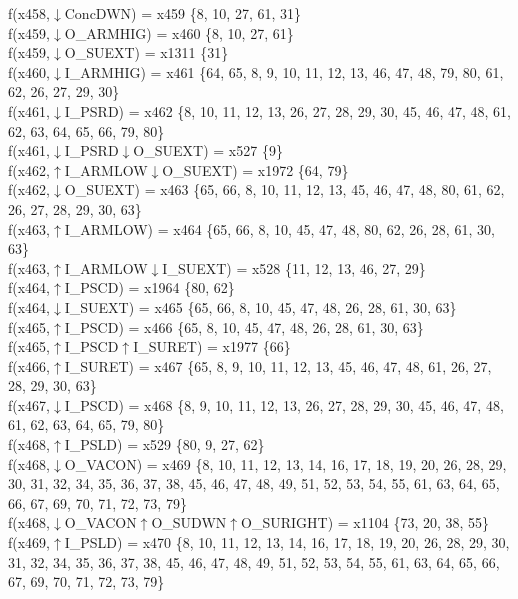 f(x458,$\downarrow$ConcDWN) = x459 \{8, 10, 27, 61, 31\} \\  
f(x459,$\downarrow$O\_ARMHIG) = x460 \{8, 10, 27, 61\} \\  
f(x459,$\downarrow$O\_SUEXT) = x1311 \{31\} \\  
f(x460,$\downarrow$I\_ARMHIG) = x461 \{64, 65, 8, 9, 10, 11, 12, 13, 46, 47, 48, 79, 80, 61, 62, 26, 27, 29, 30\} \\  
f(x461,$\downarrow$I\_PSRD) = x462 \{8, 10, 11, 12, 13, 26, 27, 28, 29, 30, 45, 46, 47, 48, 61, 62, 63, 64, 65, 66, 79, 80\} \\  
f(x461,$\downarrow$I\_PSRD$\downarrow$O\_SUEXT) = x527 \{9\} \\  
f(x462,$\uparrow$I\_ARMLOW$\downarrow$O\_SUEXT) = x1972 \{64, 79\} \\  
f(x462,$\downarrow$O\_SUEXT) = x463 \{65, 66, 8, 10, 11, 12, 13, 45, 46, 47, 48, 80, 61, 62, 26, 27, 28, 29, 30, 63\} \\  
f(x463,$\uparrow$I\_ARMLOW) = x464 \{65, 66, 8, 10, 45, 47, 48, 80, 62, 26, 28, 61, 30, 63\} \\  
f(x463,$\uparrow$I\_ARMLOW$\downarrow$I\_SUEXT) = x528 \{11, 12, 13, 46, 27, 29\} \\  
f(x464,$\uparrow$I\_PSCD) = x1964 \{80, 62\} \\  
f(x464,$\downarrow$I\_SUEXT) = x465 \{65, 66, 8, 10, 45, 47, 48, 26, 28, 61, 30, 63\} \\  
f(x465,$\uparrow$I\_PSCD) = x466 \{65, 8, 10, 45, 47, 48, 26, 28, 61, 30, 63\} \\  
f(x465,$\uparrow$I\_PSCD$\uparrow$I\_SURET) = x1977 \{66\} \\  
f(x466,$\uparrow$I\_SURET) = x467 \{65, 8, 9, 10, 11, 12, 13, 45, 46, 47, 48, 61, 26, 27, 28, 29, 30, 63\} \\  
f(x467,$\downarrow$I\_PSCD) = x468 \{8, 9, 10, 11, 12, 13, 26, 27, 28, 29, 30, 45, 46, 47, 48, 61, 62, 63, 64, 65, 79, 80\} \\  
f(x468,$\uparrow$I\_PSLD) = x529 \{80, 9, 27, 62\} \\  
f(x468,$\downarrow$O\_VACON) = x469 \{8, 10, 11, 12, 13, 14, 16, 17, 18, 19, 20, 26, 28, 29, 30, 31, 32, 34, 35, 36, 37, 38, 45, 46, 47, 48, 49, 51, 52, 53, 54, 55, 61, 63, 64, 65, 66, 67, 69, 70, 71, 72, 73, 79\} \\  
f(x468,$\downarrow$O\_VACON$\uparrow$O\_SUDWN$\uparrow$O\_SURIGHT) = x1104 \{73, 20, 38, 55\} \\  
f(x469,$\uparrow$I\_PSLD) = x470 \{8, 10, 11, 12, 13, 14, 16, 17, 18, 19, 20, 26, 28, 29, 30, 31, 32, 34, 35, 36, 37, 38, 45, 46, 47, 48, 49, 51, 52, 53, 54, 55, 61, 63, 64, 65, 66, 67, 69, 70, 71, 72, 73, 79\} \\  
